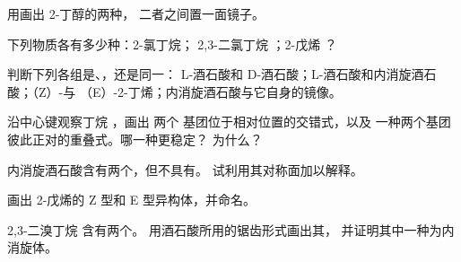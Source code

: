 \begin{exercise}[$\star\star$]\label{exo:g12:stereochemistry:6}
用画出 2-丁醇的两种，
二者之间置一面镜子。
\end{exercise}

\begin{exercise}[$\star\star$]\label{exo:g12:stereochemistry:7}
下列物质各有多少种：2-氯丁烷；
2,3-二氯丁烷 ；2-戊烯
？
\end{exercise}

\begin{exercise}[$\star\star$]\label{exo:g12:stereochemistry:8}
判断下列各组是、，还是同一：
L-酒石酸和 D-酒石酸；L-酒石酸和内消旋酒石酸；（Z）-与
（E）-2-丁烯；内消旋酒石酸与它自身的镜像。
\end{exercise}

\begin{exercise}[$\star\star$]\label{exo:g12:stereochemistry:9}
沿中心键观察丁烷 ，画出
两个  基团位于相对位置的交错式，以及
一种两个基团彼此正对的重叠式。哪一种更稳定？
为什么？
\end{exercise}

\begin{exercise}[$\star\star$]\label{exo:g12:stereochemistry:10}
内消旋酒石酸含有两个，但不具有。
试利用其对称面加以解释。
\end{exercise}

\begin{exercise}[$\star\star$]\label{exo:g12:stereochemistry:11}
画出 2-戊烯的 Z 型和 E 型异构体，并命名。
\end{exercise}

\begin{exercise}[$\star\star\star$]\label{exo:g12:stereochemistry:12}
2,3-二溴丁烷  含有两个。
用酒石酸所用的锯齿形式画出其，
并证明其中一种为内消旋体。
\end{exercise}


